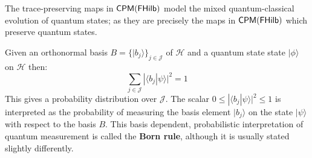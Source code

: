 The trace-preserving maps in $\mathsf{CPM}(\mathsf{FHilb})$ model the mixed quantum-classical evolution of quantum states; as they are precisely the maps in $\mathsf{CPM}(\mathsf{FHilb})$ which preserve quantum states.



Given an orthonormal basis $B=\{ |b_j\rangle \}_{j \in \mathcal J}$ of $\mathcal H$ and a quantum state state $|\phi\rangle$ on $\mathcal H$ then:
$$
\sum_{j\in \mathcal J}
 |\langle b_j|\psi \rangle|^2
=1
$$ 
This gives a probability distribution over $\mathcal J$.  The scalar  $0\leq |\langle b_j|\psi \rangle|^2\leq 1$ is interpreted as the probability of measuring the basis element $|b_j\rangle$ on the state $|\psi\rangle$ with respect to the basis $B$.
This basis dependent, probabilistic interpretation of quantum measurement is called the {\bf Born rule}, although it is usually stated slightly differently.

